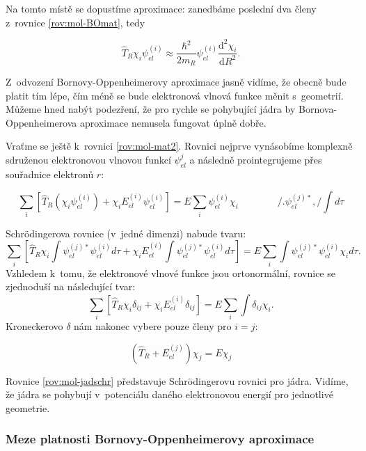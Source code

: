 \noindent Na tomto místě se dopustíme aproximace: zanedbáme poslední dva členy z~rovnice \ref{rov:mol-BOmat}, tedy
 
\begin{equation}
\hat{T}_R\chi_i\psi_{el}^{(i)}\approx\frac{\hbar^2}{2m_R}
\psi_{el}^{(i)}\frac{\mathrm{d}^2\chi_i}{\mathrm{d}R^2}.
\end{equation}

\noindent Z~odvození Bornovy-Oppenheimerovy aproximace jasně vidíme, že obecně bude platit tím lépe, čím méně se bude elektronová vlnová funkce měnit s~geometrií. Můžeme hned nabýt podezření, že pro rychle se pohybující jádra by Bornova-Oppenheimerova aproximace nemusela fungovat úplně dobře.

Vraťme se ještě k~rovnici \ref{rov:mol-mat2}. Rovnici nejprve vynásobíme komplexně sdruženou elektronovou vlnovou funkcí $\psi_{el}^{j}$ a následně prointegrujeme přes souřadnice elektronů $r$:

\begin{equation}
\sum_i \left[\hat{T}_R(\chi_i\psi_{el}^{(i)}) + \chi_iE_{el}^{(i)}\psi_{el}^{(i)}\right]=E\sum_i \psi_{el}^{(i)}\chi_i \qquad \qquad /.\psi_{el}^{(j)*},/\int d\tau
\end{equation}


\noindent Schrödingerova rovnice (v~jedné dimenzi) nabude tvaru:
\begin{equation}
\sum_i \left[\hat{T}_R\chi_i\int\psi_{el}^{(j)*}\psi_{el}^{(i)}d\tau + \chi_iE_{el}^{(i)}\int\psi_{el}^{(j)*}\psi_{el}^{(i)}d\tau\right]=E\sum_i \int \psi_{el}^{(j)*}\psi_{el}^{(i)}\chi_id\tau. 
\end{equation}
Vzhledem k~tomu, že elektronové vlnové funkce jsou ortonormální, rovnice se zjednoduší na následující tvar:
\begin{equation}
\sum_i \left[\hat{T}_R\chi_i\delta_{ij} + \chi_iE_{el}^{(i)}\delta_{ij}\right]=E\sum_i \int \delta_{ij}\chi_i. 
\end{equation}
Kroneckerovo $\delta$ nám nakonec vybere pouze členy pro $i=j$:

\begin{equation}
\left(\hat{T}_R+E_{el}^{(j)}\right)\chi_j=E\chi_j
\label{rov:mol-jadschr}
\end{equation}

\noindent Rovnice \ref{rov:mol-jadschr} představuje Schrödingerovu rovnici pro jádra. Vidíme, že jádra se pohybují v~potenciálu daného elektronovou energií pro jednotlivé geometrie. 

\subsubsection{Meze platnosti Bornovy-Oppenheimerovy aproximace}

